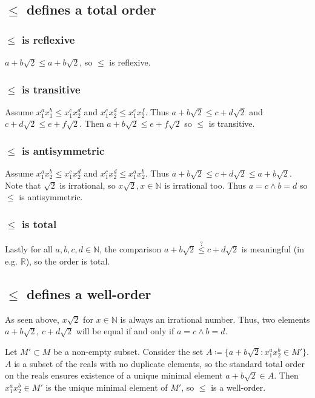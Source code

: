 \documentclass[a4paper]{scrreprt}
\begin{document}
\subsection{$\leq$ defines a total order}

\subsubsection{$\leq$ is reflexive}

$a + b \sqrt{2} \leq a + b \sqrt{2}$, so $\leq$ is reflexive.

\subsubsection{$\leq$ is transitive}

Assume $x_1^a x_1^b \leq x_1^c x_2^d$ and $x_1^c x_2^d \leq x_1^e x_2^f$. Thus
$a + b \sqrt{2} \leq c + d \sqrt{2}$ and $c + d \sqrt{2} \leq e + f \sqrt{2}$.
Then $a + b \sqrt{2} \leq e + f \sqrt{2}$ so $\leq$ is transitive.

\subsubsection{$\leq$ is antisymmetric}

Assume $x_1^a x_2^b \leq x_1^c x_2^d$ and $x_1^c x_2^d \leq x_1^a x_2^b$. Thus
$a + b \sqrt{2} \leq c + d \sqrt{2} \leq a + b \sqrt{2}$. Note that $\sqrt{2}$
is irrational, so $x \sqrt{2}, x \in \mathbb{N}$ is irrational too. Thus $a = c
\land b = d$ so $\leq$ is antisymmetric.

\subsubsection{$\leq$ is total}

Lastly for all $a, b, c, d \in \mathbb{N}$, the comparison $a + b \sqrt{2}
\overset{?}{\leq} c + d \sqrt{2}$ is meaningful (in e.g. $\mathbb{R}$), so the
order is total.

\subsection{$\leq$ defines a well-order}

As seen above, $x \sqrt{2}$ for $x \in \mathbb{N}$ is always an irrational
number. Thus, two elements $a + b \sqrt{2}$, $c + d \sqrt{2}$ will be equal if
and only if $a = c \land b = d$.

Let $M' \subset M$ be a non-empty subset. Consider the set $A \coloneqq \{a + b
\sqrt{2} : x_1^a x_2^b \in M'\}$. $A$ is a subset of the reals with no
duplicate elements, so the standard total order on the reals ensures existence
of a unique minimal element $a + b \sqrt{2} \in A$. Then $x_1^a x_2^b \in M'$
is the unique minimal element of $M'$, so $\leq$ is a well-order.
\end{document}
